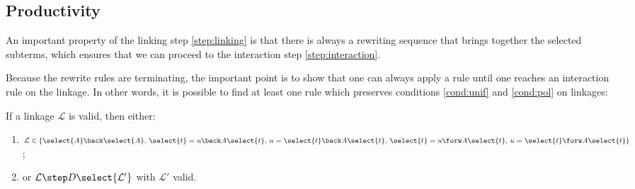 \subsection{Productivity}

An important property of the linking step \ref{step:linking} is that there is
always a rewriting sequence that brings together the selected subterms, which
ensures that we can proceed to the interaction step \ref{step:interaction}.





Because the rewrite rules are terminating, the important point is to show that
one can always apply a rule until one reaches an interaction rule on the
linkage. In other words, it is possible to find at least one rule which
preserves conditions \ref{cond:unif} and \ref{cond:pol} on linkages:

\begin{lemma}\label{thm:vprogress}
  If a linkage $\mathcal{L}$ is valid, then either:
  \begin{enumerate}
    \item $\mathcal{L} \in \{
        \select{A}\back \select{A},\,
        \select{t} = u \back A\select{t},\,
        u = \select{t} \back A\select{t},\, 
        \select{t} = u \forw A\select{t},\,
        u = \select{t} \forw A\select{t}
      \}$;
    \item or $\mathcal{L} \step D\select{\mathcal{L'}}$ with
      $\mathcal{L'}$ valid.
  \end{enumerate}
\end{lemma}

